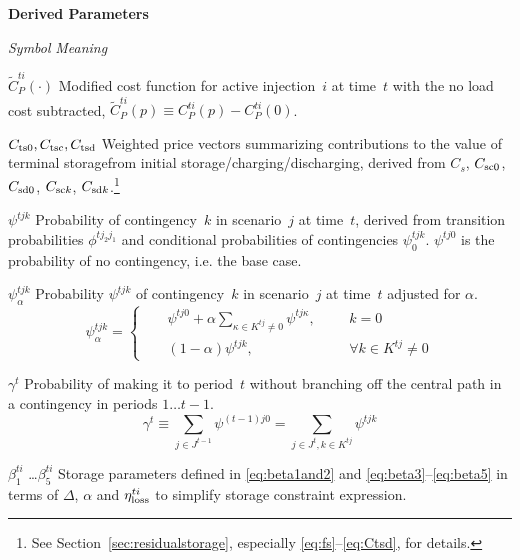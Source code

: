 \documentclass[12pt]{article}
\newcommand{\namelistlabel}[1]{\mbox{#1}\hfil}
\newenvironment{namelist}[1]{%
\begin{list}{}
  {
    \let\makelabel\namelistlabel
    \settowidth{\labelwidth}{#1}
    \setlength{\leftmargin}{1.1\labelwidth}
  }
 }{%
\end{list}}
\numberwithin{equation}{section}
\numberwithin{table}{section}
\numberwithin{figure}{section}
\begin{document}
\begin{namelist}{XXXXXXXXXX}
\item[]
\item[{\bf Derived Parameters}]
\item[\emph{Symbol}] \emph{Meaning}
\item[$\widetilde{C}_P^{ti}(\cdot)$] Modified cost function for active injection~$i$ at time~$t$ with the no load cost subtracted, $\widetilde{C}_P^{ti}(p) \equiv C_P^{ti}(p) - C_P^{ti}(0)$.
\item[$C_{\rm ts0}, C_{\rm tsc}, C_{\rm tsd}$] Weighted price vectors summarizing contributions to the value of terminal storage\footnotemark[\value{footnote}] from initial storage/charging/discharging, derived from $C_{s}$, $C_{\rm sc0}$, $C_{\rm sd0}$, $C_{{\rm sc}k}$, $C_{{\rm sd}k}$.\footnote{See Section~\ref{sec:residualstorage}, especially \eqref{eq:fs}--\eqref{eq:Ctsd}, for details.}
\item[$\psi^{tjk}$] Probability of contingency~$k$ in scenario~$j$ at time~$t$, derived from transition probabilities $\phi^{tj_2j_1}$ and conditional probabilities of contingencies $\psi_0^{tjk}$. $\psi^{tj0}$ is the probability of no contingency, i.e. the base case.
\item[$\psi_\alpha^{tjk}$] Probability $\psi^{tjk}$ of contingency~$k$ in scenario~$j$ at time~$t$ adjusted for $\alpha$. \\
                \begin{equation}
                    \psi_\alpha^{tjk} = \left\{\begin{aligned}
                        && \psi^{tj0} + \alpha \!\!\! \sum_{\kappa \in K^{tj} \ne 0} \psi^{tj\kappa}, &&& k = 0 \\
                        && (1-\alpha) \psi^{tjk}, &&& \forall k \in K^{tj} \ne 0
                    \end{aligned}\right.
                    \label{eq:psialpha}
                \end{equation}
\item[$\gamma^t$] Probability of making it to period~$t$ without branching off the central path in a contingency in periods $1\ldots t-1$.
\begin{equation}
\gamma^t \equiv \!\! \sum_{j \in J^{t-1}} \psi^{(t-1)j0} = \!\!\!\!\! \sum_{j \in J^t, k \in K^{tj}} \!\!\! \psi^{tjk}
\end{equation}
\item[$\beta_1^{ti}$ \dots $\beta_5^{ti}$] Storage parameters defined in \eqref{eq:beta1and2} and \eqref{eq:beta3}--\eqref{eq:beta5} in terms of $\Delta$, $\alpha$ and $\eta^{ti}_{\rm loss}$ to simplify storage constraint expression.



\end{namelist}
\end{document}
